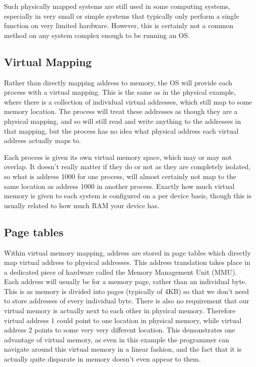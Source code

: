 Such physically mapped systems are still used in some computing systems, especially in very small or simple systems that typically only perform a single function on very limited hardware. However, this is certainly not a common method on any system complex enough to be running an OS.

\subsection{Virtual Mapping}

Rather than directly mapping address to memory, the OS will provide each process with a virtual mapping. This is the same as in the physical example, where there is a collection of individual virtual addresses, which still map to some memory location. The process will treat these addresses as though they are a physical mapping, and so will still read and write anything to the addresses in that mapping, but the process has no idea what physical address each virtual address actually maps to.

Each process is given its own virtual memory space, which may or may not overlap. It doesn't really matter if they do or not as they are completely isolated, so what is address 1000 for one process, will almost certainly not map to the same location as address 1000 in another process. Exactly how much virtual memory is given to each system is configured on a per device basis, though this is usually related to how much RAM your device has.

\subsection{Page tables}

Within virtual memory mapping, address are stored in page tables which directly map virtual address to physical addresses. This address translation takes place in a dedicated piece of hardware called the Memory Management Unit (MMU). Each address will usually be for a memory page, rather than an individual byte. This is as memory is divided into pages (typically of 4KB) so that we don't need to store addresses of every individual byte. There is also no requirement that our virtual memory is actually next to each other in physical memory. Therefore virtual address 1 could point to one location in physical memory, while virtual address 2 points to some very very different location. This demonstrates one advantage of virtual memory, as even in this example the programmer can navigate around this virtual memory in a linear fashion, and the fact that it is actually quite disparate in memory doesn't even appear to them. 


